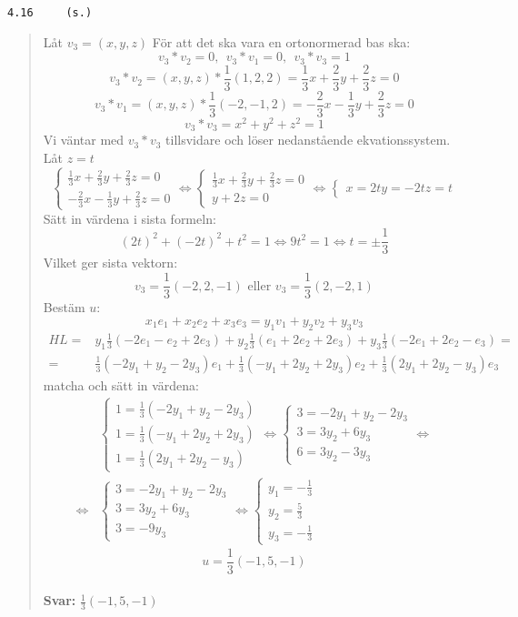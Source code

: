 \documentclass[a4paper]{article}
\newcommand{\tskcol}[1]{\textcolor{tskcol}{#1}}
\begin{document}
\texttt{\tskcol{4.16~~~~ (s.)}}
\begin{quotation}
	\noindent
	Låt $v_3=(x,y,z)$
	För att det ska vara en ortonormerad bas ska:
	\[v_3*v_2=0,~~v_3*v_1=0,~~v_3*v_3=1\]
	\[v_3*v_2=(x,y,z)*\frac{1}{3}(1,2,2)=\frac{1}{3}x+\frac{2}{3}y+\frac{2}{3}z=0\]
	\[v_3*v_1=(x,y,z)*\frac{1}{3}(-2,-1,2)=-\frac{2}{3}x-\frac{1}{3}y+\frac{2}{3}z=0\]
	\[v_3*v_3=x^2+y^2+z^2=1\]
	Vi väntar med $v_3*v_3$ tillsvidare och löser nedanstående ekvationssystem. Låt $z=t$
	\[\begin{cases}
	\frac{1}{3}x+\frac{2}{3}y+\frac{2}{3}z=0 \\
	-\frac{2}{3}x-\frac{1}{3}y+\frac{2}{3}z=0
	\end{cases} \Leftrightarrow
	\begin{cases}
	\frac{1}{3}x+\frac{2}{3}y+\frac{2}{3}z=0 \\
	y+2z=0
	\end{cases} \Leftrightarrow
	\begin{cases}
	x=2t
	y=-2t
	z=t
	\end{cases}\]
	Sätt in värdena i sista formeln:
	\[(2t)^2+(-2t)^2+t^2=1 \Leftrightarrow
	9t^2=1 \Leftrightarrow
	t=\pm\frac{1}{3}\]
	Vilket ger sista vektorn:
	\[v_3=\frac{1}{3}(-2,2,-1) \text{ eller } v_3=\frac{1}{3}(2,-2,1)\]
	Bestäm $u$:
	\[x_1e_1+x_2e_2+x_3e_3=y_1v_1+y_2v_2+y_3v_3\]
	\begin{align*}
	HL=&y_1\frac{1}{3}(-2e_1-e_2+2e_3)+y_2\frac{1}{3}(e_1+2e_2+2e_3)+y_3\frac{1}{3}(-2e_1+2e_2-e_3)= \\ =
	&\frac{1}{3}(-2y_1+y_2-2y_3)e_1+\frac{1}{3}(-y_1+2y_2+2y_3)e_2+\frac{1}{3}(2y_1+2y_2-y_3)e_3
	\end{align*}
	matcha och sätt in värdena:
	\begin{align*}
	&\begin{cases}
	1=\frac{1}{3}(-2y_1+y_2-2y_3) \\
	1=\frac{1}{3}(-y_1+2y_2+2y_3) \\
	1=\frac{1}{3}(2y_1+2y_2-y_3)
	\end{cases} \Leftrightarrow
	\begin{cases}
	3=-2y_1+y_2-2y_3 \\
	3=3y_2+6y_3 \\
	6=3y_2-3y_3 
	\end{cases} \Leftrightarrow \\ \Leftrightarrow
	&\begin{cases}
	3=-2y_1+y_2-2y_3 \\
	3=3y_2+6y_3 \\
	3=-9y_3 
	\end{cases} \Leftrightarrow
	\begin{cases}
	y_1=-\frac{1}{3} \\
	y_2=\frac{5}{3} \\
	y_3=-\frac{1}{3}
	\end{cases}
	\end{align*}
	\[u=\frac{1}{3}(-1,5,-1)\]
	\\
	\textbf{Svar:} $\frac{1}{3}(-1,5,-1)$
\end{quotation}
\end{document}
